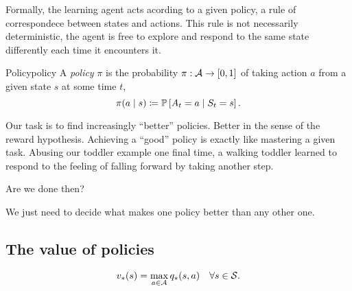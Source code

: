 Formally, the learning agent acts acording to a given policy, a rule of
correspondece between states and actions. This rule is not necessarily
deterministic, the agent is free to explore and respond to the same state
differently each time it encounters it.

\begin{dfn}{Policy}{policy}
	A \emph{policy} $\pi$ is the probability $\pi: \mathcal{A} \to [0,1]$ of taking
	action $a$ from a given state $s$ at some time $t$,
	\begin{equation*}
		\pi(a \mid s) \coloneqq \mathbb{P}\left[A_t = a \mid S_t = s\right].
	\end{equation*}
\end{dfn}

Our task is to find increasingly ``better'' policies. Better in the sense of the
reward hypothesis. Achieving a ``good'' policy is exactly like mastering a given
task. Abusing our toddler example one final time, a walking toddler learned to
respond to the feeling of falling forward by taking another step.

Are we done then? 

We just need to decide what makes one policy better than any other one.

\subsection{The value of policies}

\begin{equation}
	\label{eq:prop-dependencia-vq}
	v_* (s) = \max_{a \in \mathcal{A}} q_* (s, a) \quad \forall s \in \mathcal{S}.
\end{equation}